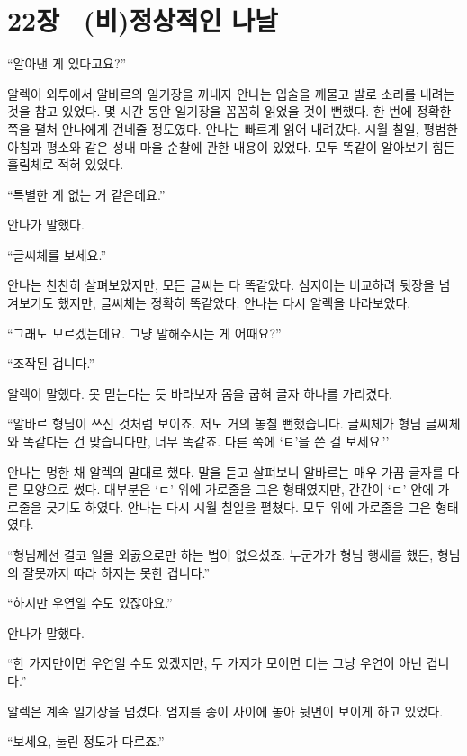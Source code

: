 

\chapter[22장  (비)정상적인 나날][22장\hspace*{.5em}(비)정상적인 나날]{22장 \ (비)정상적인 나날}



\forceindent``알아낸 게 있다고요?''

알렉이 외투에서 알바르의 일기장을 꺼내자 안나는 입술을 깨물고 발로 소리를 내려는 것을 참고 있었다. 몇 시간 동안 일기장을 꼼꼼히 읽었을 것이 뻔했다. 한 번에 정확한 쪽을 펼쳐 안나에게 건네줄 정도였다. 안나는 빠르게 읽어 내려갔다. 시월 칠일, 평범한 아침과 평소와 같은 성내 마을 순찰에 관한 내용이 있었다. 모두 똑같이 알아보기 힘든 흘림체로 적혀 있었다.

``특별한 게 없는 거 같은데요.''

안나가 말했다.

``글씨체를 보세요.''

안나는 찬찬히 살펴보았지만, 모든 글씨는 다 똑같았다. 심지어는 비교하려 뒷장을 넘겨보기도 했지만, 글씨체는 정확히 똑같았다. 안나는 다시 알렉을 바라보았다.

``그래도 모르겠는데요. 그냥 말해주시는 게 어때요?''

``조작된 겁니다.''

알렉이 말했다. 못 믿는다는 듯 바라보자 몸을 굽혀 글자 하나를 가리켰다.

``알바르 형님이 쓰신 것처럼 보이죠. 저도 거의 놓칠 뻔했습니다. 글씨체가 형님 글씨체와 똑같다는 건 맞습니다만, 너무 똑같죠. 다른 쪽에 `ㅌ'을 쓴 걸 보세요.''

안나는 멍한 채 알렉의 말대로 했다. 말을 듣고 살펴보니 알바르는 매우 가끔 글자를 다른 모양으로 썼다. 대부분은 `ㄷ' 위에 가로줄을 그은 형태였지만, 간간이 `ㄷ' 안에 가로줄을 긋기도 하였다. 안나는 다시 시월 칠일을 펼쳤다. 모두 위에 가로줄을 그은 형태였다.

``형님께선 결코 일을 외곬으로만 하는 법이 없으셨죠. 누군가가 형님 행세를 했든, 형님의 잘못까지 따라 하지는 못한 겁니다.''

``하지만 우연일 수도 있잖아요.''

안나가 말했다.

``한 가지만이면 우연일 수도 있겠지만, 두 가지가 모이면 더는 그냥 우연이 아닌 겁니다.''

알렉은 계속 일기장을 넘겼다. 엄지를 종이 사이에 놓아 뒷면이 보이게 하고 있었다.

``보세요, 눌린 정도가 다르죠.''

